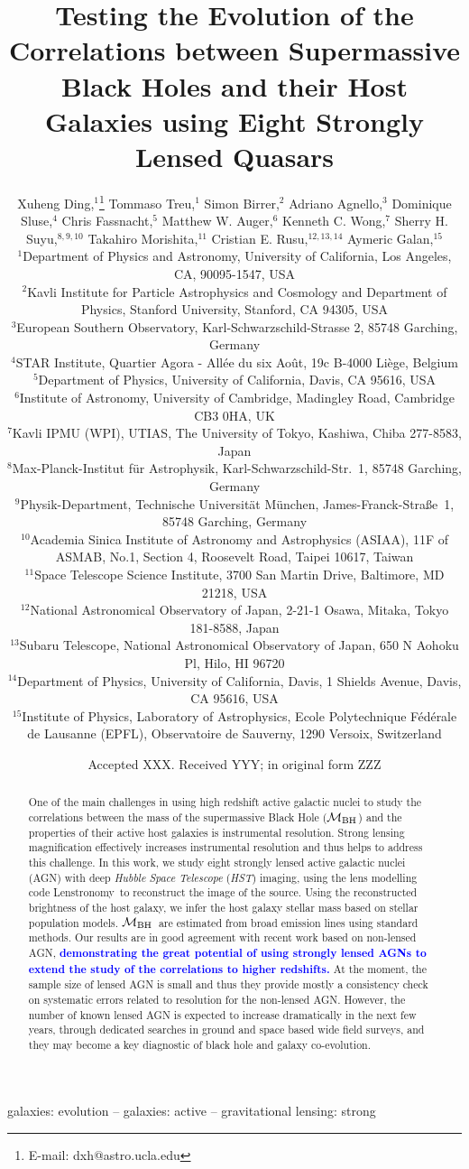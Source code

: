 \documentclass[fleqn,usenatbib]{mnras}
\title[Mass correlations of lensed AGN hosts]{Testing the Evolution of the Correlations between Supermassive Black Holes and their Host Galaxies using Eight Strongly Lensed Quasars}
\author[X. Ding et al.]{
Xuheng Ding,$^{1}$\thanks{E-mail: dxh@astro.ucla.edu}
Tommaso Treu,$^{1}$
Simon Birrer,$^{2}$
Adriano Agnello,$^{3}$\newauthor
Dominique Sluse,$^{4}$
Chris Fassnacht,$^{5}$
Matthew W. Auger,$^{6}$
Kenneth C. Wong,$^{7}$ \newauthor
Sherry H. Suyu,$^{8,9,10}$
Takahiro Morishita,$^{11}$
Cristian E. Rusu,$^{12,13,14}$
Aymeric Galan,$^{15}$
\\
$^{1}$Department of Physics and Astronomy, University of California, Los Angeles, CA, 90095-1547, USA\\
$^{2}$Kavli Institute for Particle Astrophysics and Cosmology and Department of Physics, Stanford University, Stanford, CA 94305, USA\\
$^{3}$European Southern Observatory, Karl-Schwarzschild-Strasse 2, 85748 Garching, Germany\\
$^{4}$STAR Institute, Quartier Agora - All\'ee du six Ao\^ut, 19c B-4000 Li\`ege, Belgium\\
$^{5}$Department of Physics, University of California, Davis, CA 95616, USA\\
$^{6}$Institute of Astronomy, University of Cambridge, Madingley Road, Cambridge CB3 0HA, UK\\
$^{7}$Kavli IPMU (WPI), UTIAS, The University of Tokyo, Kashiwa, Chiba 277-8583, Japan\\
$^{8}$Max-Planck-Institut f{\"u}r Astrophysik, Karl-Schwarzschild-Str.~1, 85748 Garching, Germany\\
$^{9}$Physik-Department, Technische Universit\"at M\"unchen, James-Franck-Stra\ss{}e~1, 85748 Garching, Germany\\
$^{10}$Academia Sinica Institute of Astronomy and Astrophysics (ASIAA), 11F of ASMAB, No.1, Section 4, Roosevelt Road, Taipei 10617, Taiwan\\
$^{11}$Space Telescope Science Institute, 3700 San Martin Drive, Baltimore, MD 21218, USA\\
$^{12}$National Astronomical Observatory of Japan, 2-21-1 Osawa, Mitaka, Tokyo 181-8588, Japan\\
$^{13}$Subaru Telescope, National Astronomical Observatory of Japan, 650 N Aohoku Pl, Hilo, HI 96720\\
$^{14}$Department of Physics, University of California, Davis, 1 Shields Avenue, Davis, CA 95616, USA\\
$^{15}$Institute of Physics, Laboratory of Astrophysics, Ecole Polytechnique 
F\'ed\'erale de Lausanne (EPFL), Observatoire de Sauverny, 1290 Versoix, 
Switzerland
}
\date{Accepted XXX. Received YYY; in original form ZZZ}
\newcommand{\hst}{{\it HST}}
\newcommand{\mbh}{$\mathcal M_{\rm BH}$}
\newcommand{\lenstronomy}{{\sc Lenstronomy}}
\newcommand{\blue}[1]{{\bf \textcolor{blue}{#1}}}
\begin{document}
\label{firstpage}
\pagerange{\pageref{firstpage}--\pageref{lastpage}}
\maketitle

\begin{abstract}
One of the main challenges in using high redshift active galactic nuclei to study the correlations between the mass of the supermassive Black Hole (\mbh) and the properties of their active host galaxies is instrumental resolution. Strong lensing magnification effectively increases instrumental resolution and thus helps to address this challenge. In this work, we study eight strongly lensed active galactic nuclei (AGN) with deep {\it Hubble Space Telescope} (\hst) imaging, using the lens modelling code \lenstronomy\ to reconstruct the image of the source. Using the reconstructed brightness of the host galaxy, we infer the host galaxy stellar mass based on stellar population models.  \mbh\ are estimated from broad emission lines using standard methods. Our results are in good agreement with recent work based on non-lensed AGN, \blue{demonstrating the great potential of using strongly lensed AGNs to extend the study of the correlations to higher redshifts.}
At the moment, the sample size of lensed AGN is small and thus they provide mostly a consistency check on systematic errors related to resolution for the non-lensed AGN. However, the number of known lensed AGN is expected to increase dramatically in the next few years, through dedicated searches in ground and space based wide field surveys, and they may become a key diagnostic of black hole and galaxy co-evolution. 
\end{abstract}

\begin{keywords}
galaxies: evolution -- galaxies: active -- gravitational lensing: strong
\end{keywords}


\end{document}
